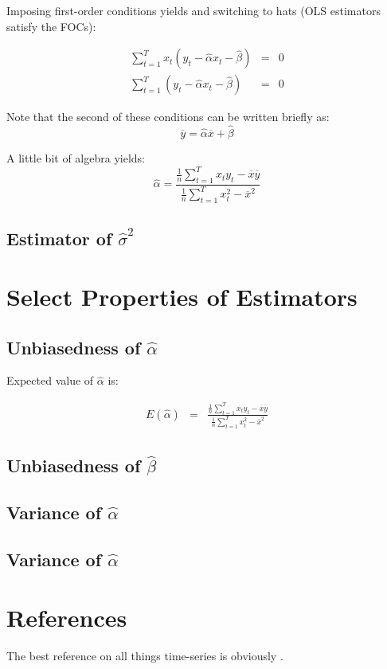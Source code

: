 \documentclass[12pt]{article}
\begin{document}
Imposing first-order conditions yields and switching to hats (OLS estimators satisfy the FOCs):

\begin{eqnarray}
\sum_{t=1}^{T}x_t (y_t - \hat{\alpha} x_t - \hat{\beta}) &=&  0 \\
\sum_{t=1}^{T} (y_t - \hat{\alpha} x_t - \hat{\beta}) &=& 0
\end{eqnarray}

Note that the second of these conditions can be written briefly as:
\begin{equation}
\overline{y} = \hat{\alpha} \overline{x} + \hat{\beta}
\end{equation}

A little bit of algebra yields:
\begin{equation}
\hat{\alpha} = \frac{\frac{1}{n}\sum\limits_{t=1}^{T}x_t y_t - \overline{x} \overline{y}}
{\frac{1}{n}\sum\limits_{t=1}^{T}x_t^2 - \overline{x}^2}
\end{equation}

\subsection{Estimator of $\hat{\sigma}^2$}


\section{Select Properties of Estimators}

\subsection{Unbiasedness of $\hat{\alpha}$}
Expected value of $\hat{\alpha}$ is:

\begin{eqnarray}
E(\hat{\alpha}) &=& \frac{\frac{1}{n}\sum\limits_{t=1}^{T}x_t y_t - \overline{x} \overline{y}}{\frac{1}{n}\sum\limits_{t=1}^{T}x_t^2 - \overline{x}^2}
\end{eqnarray}

\subsection{Unbiasedness of $\hat{\beta}$}

\subsection{Variance of $\hat{\alpha}$}
\subsection{Variance of $\hat{\alpha}$}


\section{References}
The best reference on all things time-series is obviously \cite{hamilton_tsa}. 




\end{document}
